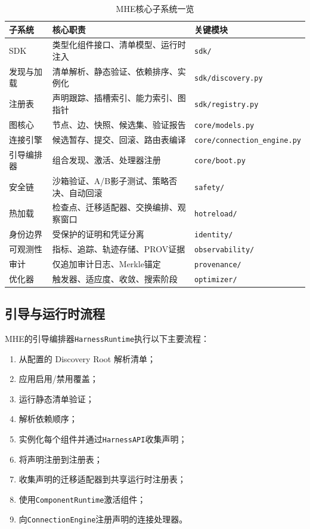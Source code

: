\documentclass[12pt,a4paper]{ctexart}
\begin{document}
\begin{table}[H]
\centering
\caption{MHE核心子系统一览}\label{tab:mhe-components}
\begin{tabular}{@{}lll@{}}
\toprule
\textbf{子系统} & \textbf{核心职责} & \textbf{关键模块} \\
\midrule
SDK & 类型化组件接口、清单模型、运行时注入 & \texttt{sdk/} \\
发现与加载 & 清单解析、静态验证、依赖排序、实例化 & \texttt{sdk/discovery.py} \\
注册表 & 声明跟踪、插槽索引、能力索引、图指针 & \texttt{sdk/registry.py} \\
图核心 & 节点、边、快照、候选集、验证报告 & \texttt{core/models.py} \\
连接引擎 & 候选暂存、提交、回滚、路由表编译 & \texttt{core/connection\_engine.py} \\
引导编排器 & 组合发现、激活、处理器注册 & \texttt{core/boot.py} \\
安全链 & 沙箱验证、A/B影子测试、策略否决、自动回滚 & \texttt{safety/} \\
热加载 & 检查点、迁移适配器、交换编排、观察窗口 & \texttt{hotreload/} \\
身份边界 & 受保护的证明和凭证分离 & \texttt{identity/} \\
可观测性 & 指标、追踪、轨迹存储、PROV证据 & \texttt{observability/} \\
审计 & 仅追加审计日志、Merkle锚定 & \texttt{provenance/} \\
优化器 & 触发器、适应度、收敛、搜索阶段 & \texttt{optimizer/} \\
\bottomrule
\end{tabular}
\end{table}

\subsection{引导与运行时流程}

MHE的引导编排器\texttt{HarnessRuntime}执行以下主要流程：

\begin{enumerate}
    \item 从配置的 Discovery Root 解析清单；
    \item 应用启用/禁用覆盖；
    \item 运行静态清单验证；
    \item 解析依赖顺序；
    \item 实例化每个组件并通过\texttt{HarnessAPI}收集声明；
    \item 将声明注册到注册表；
    \item 收集声明的迁移适配器到共享运行时注册表；
    \item 使用\texttt{ComponentRuntime}激活组件；
    \item 向\texttt{ConnectionEngine}注册声明的连接处理器。
\end{enumerate}
\end{document}
